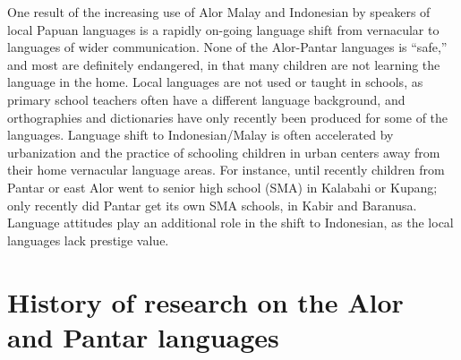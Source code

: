 One result of the increasing use of Alor Malay and Indonesian by speakers of local Papuan languages is a rapidly on-going language shift from vernacular to languages of wider communication. None of the Alor-Pantar languages is ``safe,'' and most are definitely endangered, in that many children are not learning the language in the home. Local languages are not used or taught in schools, as primary school teachers often have a different language background, and orthographies and dictionaries have only recently been produced for some of the languages. Language shift to Indonesian/Malay is often accelerated by urbanization and the practice of schooling children in urban centers away from their home vernacular language areas. For instance, until recently children from Pantar or east Alor went to senior high school (SMA) in Kalabahi or Kupang; only recently did Pantar get its own SMA schools, in Kabir and Baranusa. Language attitudes play an additional role in the shift to Indonesian, as the local languages lack prestige value.

\section{History of research on the Alor and Pantar languages}


